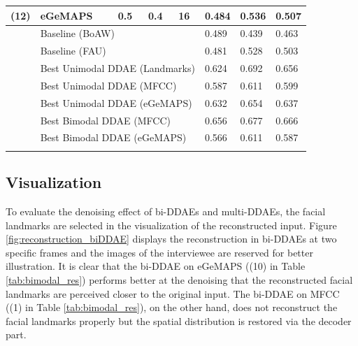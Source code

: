 \begin{table}[htb]
\begin{tabular}{l|p{1.8cm}|p{1.25cm}|l|p{1.2cm}|l|l|l}
        (12) & eGeMAPS & 0.5 & 0.4 & 16 & 0.484 & 0.536 & 0.507 \\
        \hline
        & \multicolumn{4}{l|}{Baseline (BoAW)} & 0.489 & 0.439 & 0.463 \\
        & \multicolumn{4}{l|}{Baseline (FAU)} & 0.481 & 0.528 & 0.503 \\
        \hline
        & \multicolumn{4}{l|}{Best Unimodal DDAE (Landmarks)} & 0.624 & 0.692 & 0.656 \\
        & \multicolumn{4}{l|}{Best Unimodal DDAE (MFCC)} & 0.587 & 0.611 & 0.599 \\
        & \multicolumn{4}{l|}{Best Unimodal DDAE (eGeMAPS)} & 0.632 & 0.654 & 0.637 \\
        \hline
        & \multicolumn{4}{l|}{Best Bimodal DDAE (MFCC)} & 0.656 & 0.677 & 0.666 \\
        & \multicolumn{4}{l|}{Best Bimodal DDAE (eGeMAPS)} & 0.566 & 0.611 & 0.587 \\
    \Xhline{2\arrayrulewidth}
    \end{tabular}
    \label{tab:multimodal_res}
\end{table}


\subsection{Visualization}

To evaluate the denoising effect of bi-DDAEs and multi-DDAEs, the facial landmarks are selected in the visualization of the reconstructed input. Figure \ref{fig:reconstruction_biDDAE} displays the reconstruction in bi-DDAEs at two specific frames and the images of the interviewee are reserved for better illustration. It is clear that the bi-DDAE on eGeMAPS ((10) in Table \ref{tab:bimodal_res}) performs better at the denoising that the reconstructed facial landmarks are perceived closer to the original input. The bi-DDAE on MFCC ((1) in Table \ref{tab:bimodal_res}), on the other hand, does not reconstruct the facial landmarks properly but the spatial distribution is restored via the decoder part.


